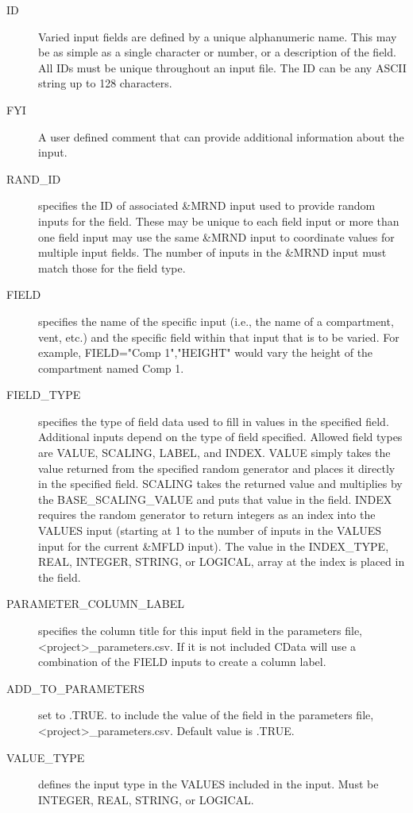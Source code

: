 \documentclass[12pt,twoside]{book}
\begin{document}
\begin{description}
  \item[ID] Varied input fields are defined by a unique alphanumeric name. This may be as simple as a single character or number, or a description of the field. All IDs must be unique throughout an input file.  The { \ct ID} can be any ASCII string up to 128 characters.
  \item[FYI] A user defined comment that can provide additional information about the input.
  \item[RAND\_ID] specifies the ID of associated {\ct \&MRND} input used to provide random inputs for the field. These may be unique to each field input or more than one field input may use the same {\ct \&MRND} input to coordinate values for multiple input fields. The number of inputs in the {\ct \&MRND} input must match those for the field type.
  \item[FIELD] specifies the name of the specific input (i.e., the name of a compartment, vent, etc.) and the specific field within that input that is to be varied. For example, {\ct FIELD="Comp 1","HEIGHT"} would vary the height of the compartment named {\ct Comp 1}.
  \item[FIELD\_TYPE] specifies the type of field data used to fill in values in the specified field. Additional inputs depend on the type of field specified. Allowed field types are {\ct VALUE}, {\ct SCALING}, {\ct LABEL}, and {\ct INDEX}. {\ct VALUE} simply takes the value returned from the specified random generator and places it directly in the specified field. {\ct SCALING} takes the returned value and multiplies by the {\ct BASE\_SCALING\_VALUE} and puts that value in the field. {\ct INDEX} requires the random generator to return integers as an index into the {\ct VALUES} input (starting at 1 to the number of inputs in the {\ct VALUES} input for the current {\ct \&MFLD} input). The value in the {\ct INDEX\_TYPE}, {\ct REAL}, {\ct INTEGER}, {\ct STRING}, or {\ct LOGICAL}, array at the index is placed in the field.
  \item[PARAMETER\_COLUMN\_LABEL] specifies the column title for this input field in the parameters file, {\ct <project>\_parameters.csv}. If it is not included CData will use a combination of the {\ct FIELD} inputs to create a column label.
  \item[ADD\_TO\_PARAMETERS] set to .TRUE. to include the value of the field in the parameters file, {\ct <project>\_parameters.csv}. Default value is .TRUE.
  \item[VALUE\_TYPE] defines the input type in the {\ct VALUES} included in the input. Must be {\ct INTEGER}, {\ct REAL}, {\ct STRING}, or {\ct LOGICAL}.

\end{description}
\end{document}
